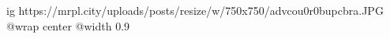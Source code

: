  
 
 
 
 

\ifcmt
  ig https://mrpl.city/uploads/posts/resize/w/750x750/advcou0r0bupcbra.JPG
  @wrap center
  @width 0.9
\fi
